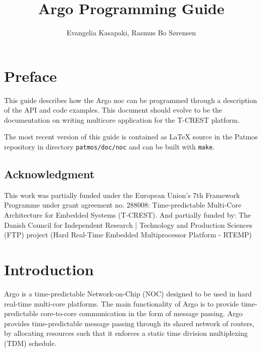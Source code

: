 \documentclass[a4paper,fontsize=10pt,twoside,DIV15,BCOR12mm,headinclude=true,footinclude=false,pagesize,bibtotoc]{scrbook}
\newcommand{\code}[1]{{\texttt{#1}}}
\newcommand{\todo}[1]{{\emph{TODO: #1}}}
\begin{document}
\title{Argo Programming Guide}

\author{Evangelia Kasapaki,  Rasmus Bo S{\o}rensen}

\lowertitleback{\todo{Copyright and license terms come here.}}

\frontmatter

\maketitle

\chapter{Preface}

This guide describes how the Argo noc can be programmed through a description of the API and code examples.
This document should evolve to be the documentation on writing multicore application for the T-CREST platform.

The most recent version of this guide is contained as LaTeX source in the Patmos repository in directory
\code{patmos/doc/noc} and can be built with \code{make}.

\section*{Acknowledgment}
This work was partially funded under the
European Union's 7th Framework Programme
under grant agreement no. 288008:
Time-predictable Multi-Core Architecture for Embedded
Systems (T-CREST).
And partially funded by:
The Danish Council for Independent Research | Technology and Production Sciences (FTP) 
project (Hard Real-Time Embedded Multiprocessor Platform - RTEMP)

\tableofcontents

\begingroup
\let\cleardoublepage\clearpage
\listoffigures
\listoftables
\endgroup

\mainmatter

\chapter{Introduction}

Argo is a time-predictable Network-on-Chip (NOC) designed to be used in hard real-time multi-core platforms.
The main functionality of Argo is to provide time-predictable core-to-core communication in the form of message passing.
Argo provides time-predictable message passing through its shared network of routers,
by allocating resources such that it enforces a static time division multiplexing (TDM) schedule.
\end{document}
